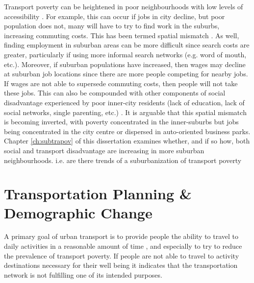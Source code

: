 Transport poverty can be heightened in poor neighbourhoods with low levels of accessibility \cite{lucas_is_2018, allen_sizing_2019}. For example, this can occur if jobs in city decline, but poor population does not, many will have to try to find work in the suburbs, increasing commuting costs. This has been termed spatial mismatch \cite{holzer_spatial_1991}. As well, finding employment in suburban areas can be more difficult since search costs are greater, particularly if using more informal search networks (e.g. word of mouth, etc.). Moreover, if suburban populations have increased, then wages may decline at suburban job locations since there are more people competing for nearby jobs. If wages are not able to supersede commuting costs, then people will not take these jobs. This can also be compounded with other components of social disadvantage experienced by poor inner-city residents (lack of education, lack of social networks, single parenting, etc.) \cite{holzer_spatial_1991}. It is arguable that this spatial mismatch is becoming inverted, with poverty concentrated in the inner-suburbs but jobs being concentrated in the city centre or dispersed in auto-oriented business parks. Chapter \ref{ch:subtrapov} of this dissertation examines whether, and if so how, both social and transport disadvantage are increasing in more suburban neighbourhoods. i.e. are there trends of a suburbanization of transport poverty







\section{Transportation Planning \& Demographic Change}


A primary goal of urban transport is to provide people the ability to travel to daily activities in a reasonable amount of time \cite{martens_transport_2016}, and especially to try to reduce the prevalence of transport poverty. If people are not able to travel to activity destinations necessary for their well being it indicates that the transportation network is not fulfilling one of its intended purposes. 

